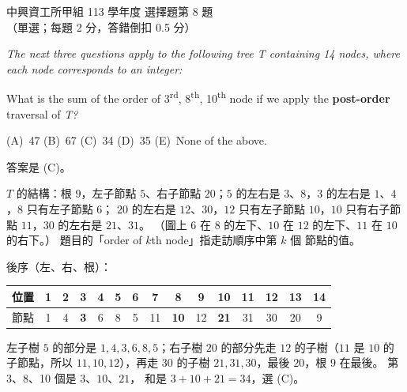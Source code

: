 \begin{pastexam}[label={px:nchu-113-dsa-08}]{中興資工所甲組 113 學年度 選擇題第 8 題}
（單選；每題 2 分，答錯倒扣 0.5 分）

\textit{The next three questions apply to the following tree T containing 14 nodes, where each node
corresponds to an integer:}

\begin{center}
\end{center}

What is the sum of the order of 3\textsuperscript{rd}, 8\textsuperscript{th}, 10\textsuperscript{th} node if we apply the \textbf{post-order} traversal of \textit{T?}

(A)~47 \qquad (B)~67 \qquad (C)~34 \qquad (D)~35 \qquad (E)~None of the above.
\end{pastexam}

\begin{pastsoln}
答案是 (C)。

$T$ 的結構：根 $9$，左子節點 $5$、右子節點 $20$；$5$ 的左右是 $3$、$8$，$3$ 的左右是 $1$、$4$，$8$ 只有左子節點 $6$；
$20$ 的左右是 $12$、$30$，$12$ 只有左子節點 $10$，$10$ 只有右子節點 $11$，$30$ 的左右是 $21$、$31$。 （圖上 $6$
在 $8$ 的左下、$10$ 在 $12$ 的左下、$11$ 在 $10$ 的右下。） 題目的「order of $k$th node」指走訪順序中第 $k$ 個
節點的值。

後序（左、右、根）：
\begin{center}
\small
\begin{tabular}{l*{14}{c}}
\toprule
位置 & 1 & 2 & 3 & 4 & 5 & 6 & 7 & 8 & 9 & 10 & 11 & 12 & 13 & 14 \\
\midrule
節點 & 1 & 4 & \textbf{3} & 6 & 8 & 5 & 11 & \textbf{10} & 12 & \textbf{21} & 31 & 30 & 20 & 9 \\
\bottomrule
\end{tabular}
\end{center}
左子樹 $5$ 的部分是 $1, 4, 3, 6, 8, 5$；右子樹 $20$ 的部分先走 $12$ 的子樹（$11$ 是 $10$ 的子節點，所以
$11, 10, 12$），再走 $30$ 的子樹 $21, 31, 30$，最後 $20$，根 $9$ 在最後。 第 3、8、10 個是 $3$、$10$、$21$，
和是 $3 + 10 + 21 = 34$，選 (C)。
\end{pastsoln}
